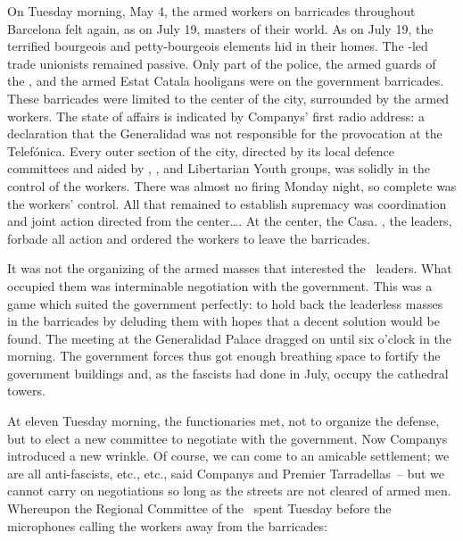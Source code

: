 On Tuesday morning, May 4, the armed workers on barricades throughout Barcelona felt again, as on July 19, masters of their world. As on July 19, the terrified bourgeois and petty-bourgeois elements hid in their homes. The \PSUC-led trade unionists remained passive. Only part of the police, the armed guards of the \PSUC\kn, and the armed Estat Catala hooligans were on the government barricades. These barricades were limited to the center of the city, surrounded by the armed workers. The state of affairs is indicated by Companys’ first radio address: a declaration that the Generalidad was not responsible for the provocation at the Telef\'onica. Every outer section of the city, directed by its local defence committees and aided by \POUM\kn, \FAI\kn, and Libertarian Youth groups, was solidly in the control of the workers. There was almost no firing Monday night, so complete was the workers’ control. All that remained to establish supremacy was coordination and joint action directed from the center\dots. At the center, the Casa. \CNT\kn, the leaders, forbade all action and ordered the workers to leave the barricades.

It was not the organizing of the armed masses that interested the \CNT\ leaders. What occupied them was interminable negotiation with the government. This was a game which suited the government perfectly: to hold back the leaderless masses in the barricades by deluding them with hopes that a decent solution would be found. The meeting at the Generalidad Palace dragged on until six o’clock in the morning. The government forces thus got enough breathing space to fortify the government buildings and, as the fascists had done in July, occupy the cathedral towers.

At eleven Tuesday morning, the functionaries met, not to organize the defense, but to elect a new committee to negotiate with the government. Now Companys introduced a new wrinkle. Of course, we can come to an amicable settlement; we are all anti-fascists, etc., etc., said Companys and Premier Tarradellas~-- but we cannot carry on negotiations so long as the streets are not cleared of armed men. Whereupon the Regional Committee of the \CNT\ spent Tuesday before the microphones calling the workers away from the barricades:

